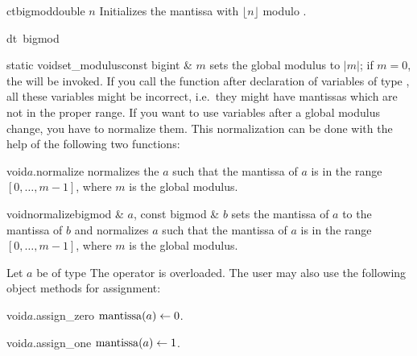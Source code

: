 \begin{fcode}{ct}{bigmod}{double $n$}
  Initializes the mantissa with $\lfloor n \rfloor$ modulo .  
\end{fcode}

\begin{fcode}{dt}{~bigmod}{}
\end{fcode}



\INIT

\label{bigmod_init}
\begin{fcode}{static void}{set_modulus}{const bigint & $m$}
  sets the global modulus to $|m|$; if $m = 0$, the \LEH will be invoked.  If you call the
  function  after declaration of variables of type , all
  these variables might be incorrect, i.e.~they might have mantissas which are not in the proper
  range.  If you want to use  variables after a global modulus change, you have to
  normalize them.  This normalization can be done with the help of the following two functions:
\end{fcode}

\begin{fcode}{void}{$a$.normalize}{}
  normalizes the  $a$ such that the mantissa of $a$ is in the range $[ 0,
  \dots, m-1 ]$, where $m$ is the global modulus.
\end{fcode}

\begin{fcode}{void}{normalize}{bigmod & $a$, const bigmod & $b$}
  sets the mantissa of $a$ to the mantissa of $b$ and normalizes $a$ such that the mantissa of
  $a$ is in the range $[ 0, \dots, m - 1 ]$, where $m$ is the global modulus.
\end{fcode}



\ASGN

Let $a$ be of type  The operator \code{=} is overloaded.  The user may also use the
following object methods for assignment:

\begin{fcode}{void}{$a$.assign_zero}{}
  $\operatorname{mantissa}(a) \leftarrow 0$.
\end{fcode}

\begin{fcode}{void}{$a$.assign_one}{}
  $\operatorname{mantissa}(a) \leftarrow 1$.
\end{fcode}

